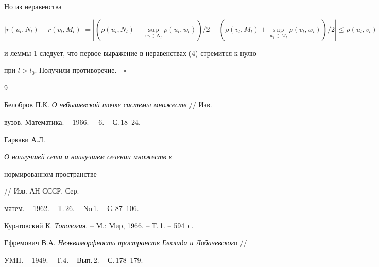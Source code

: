 Но из неравенства


$$|r(u_{l},N_{l}) - r(v_{l},M_{l})| = |(\rho(u_{l},N_{l}) + 


\sup\limits_{w_{l} \in N_{l}}{\rho(u_{l},w_{l})})/2 - (\rho(v_{l},M_{l}) + 


\sup\limits_{w_{l} \in M_{l}}{\rho(v_{l},w_{l})})/2| \leq \rho(u_{l},v_{l})


$$


и леммы 1 следует, что первое выражение в неравенствах (4) стремится к нулю


при $l > l_{0}$. Получили противоречие.$\quad\square$





\begin{thebibliography}{9}







Белобров П.К. {\em О чебышевской точке системы множеств} // Изв.


вузов. Математика. -- 1966. -- \No\,6. -- С.\,18--24.




Гаркави А.Л. {\em О наилучшей сети и наилучшем сечении множеств в


нормированном пространстве} // Изв. АН СССР. Сер.


матем. -- 1962. -- Т.\,26. -- No\,1. -- С.\,87--106.




Куратовский К. {\em Топология}. -- М.: Мир, 1966. -- Т.\,1. -- 594~с.




Ефремович В.А. {\em Неэквиморфность пространств Евклида и Лобачевского} //


УMH. -- 1949. -- Т.4. -- Вып.\,2. -- С.\,178--179.





\end{thebibliography}





\vskip 2cm












\label{end}





